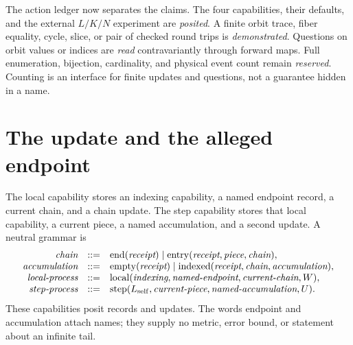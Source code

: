The action ledger now separates the claims.  The four capabilities, their defaults, and the external \(L/K/N\)
experiment are \emph{posited}.  A finite orbit trace, fiber equality, cycle, slice, or pair of checked round trips is
\emph{demonstrated}.  Questions on orbit values or indices are \emph{read} contravariantly through forward maps.
Full enumeration, bijection, cardinality, and physical event count remain \emph{reserved}.  Counting is an interface
for finite updates and questions, not a guarantee hidden in a name.

\section{The update and the alleged endpoint}

The local capability stores an indexing capability, a named endpoint record, a current chain, and a chain update.  The
step capability stores that local capability, a current piece, a named accumulation, and a second update.  A neutral
grammar is
\[
\begin{array}{rcl}
\textit{chain}&::=&\operatorname{end}(\textit{receipt})
 \mid\operatorname{entry}(\textit{receipt},\textit{piece},\textit{chain}),\\
\textit{accumulation}&::=&\operatorname{empty}(\textit{receipt})
 \mid\operatorname{indexed}(\textit{receipt},\textit{chain},\textit{accumulation}),\\
\textit{local-process}&::=&
 \operatorname{local}(\textit{indexing},\textit{named-endpoint},\textit{current-chain},W),\\
\textit{step-process}&::=&
 \operatorname{step}(L_{\rm self},\textit{current-piece},
                     \textit{named-accumulation},U).
\end{array}
\]
These capabilities posit records and updates.  The words endpoint and accumulation attach names; they supply no metric,
error bound, or statement about an infinite tail.

